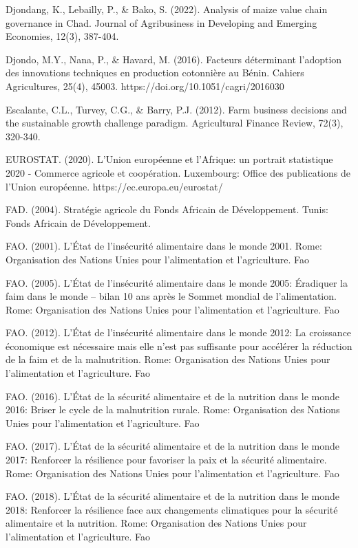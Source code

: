 \documentclass[12pt,oneside]{report}
\begin{document}
Djondang, K., Lebailly, P., \& Bako, S. (2022). Analysis of maize value chain governance in Chad. Journal of Agribusiness in Developing and Emerging Economies, 12(3), 387-404.

Djondo, M.Y., Nana, P., \& Havard, M. (2016). Facteurs déterminant l'adoption des innovations techniques en production cotonnière au Bénin. Cahiers Agricultures, 25(4), 45003. https://doi.org/10.1051/cagri/2016030

Escalante, C.L., Turvey, C.G., \& Barry, P.J. (2012). Farm business decisions and the sustainable growth challenge paradigm. Agricultural Finance Review, 72(3), 320-340.

EUROSTAT. (2020). L'Union européenne et l'Afrique: un portrait statistique 2020 - Commerce agricole et coopération. Luxembourg: Office des publications de l'Union européenne. https://ec.europa.eu/eurostat/

FAD. (2004). Stratégie agricole du Fonds Africain de Développement. Tunis: Fonds Africain de Développement.

FAO. (2001). L'État de l'insécurité alimentaire dans le monde 2001. Rome: Organisation des Nations Unies pour l'alimentation et l'agriculture. Fao

FAO. (2005). L'État de l'insécurité alimentaire dans le monde 2005: Éradiquer la faim dans le monde – bilan 10 ans après le Sommet mondial de l'alimentation. Rome: Organisation des Nations Unies pour l'alimentation et l'agriculture. Fao

FAO. (2012). L'État de l'insécurité alimentaire dans le monde 2012: La croissance économique est nécessaire mais elle n'est pas suffisante pour accélérer la réduction de la faim et de la malnutrition. Rome: Organisation des Nations Unies pour l'alimentation et l'agriculture. Fao

FAO. (2016). L'État de la sécurité alimentaire et de la nutrition dans le monde 2016: Briser le cycle de la malnutrition rurale. Rome: Organisation des Nations Unies pour l'alimentation et l'agriculture. Fao

FAO. (2017). L'État de la sécurité alimentaire et de la nutrition dans le monde 2017: Renforcer la résilience pour favoriser la paix et la sécurité alimentaire. Rome: Organisation des Nations Unies pour l'alimentation et l'agriculture. Fao

FAO. (2018). L'État de la sécurité alimentaire et de la nutrition dans le monde 2018: Renforcer la résilience face aux changements climatiques pour la sécurité alimentaire et la nutrition. Rome: Organisation des Nations Unies pour l'alimentation et l'agriculture. Fao
\end{document}
